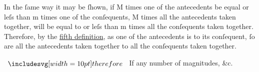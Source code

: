 \documentclass[11pt,preview]{standalone}
\begin{document}
\raggedright In the ſame way it may be ſhown, if M times one of the antecedents be equal or leſs than m times one of the conſequents, M times all the antecedents taken together, will be equal to or leſs than m times all the conſequents taken together. Therefore, by the \hyperref[book5def5]{fifth definition}, as one of the antecedents is to its conſequent, ſo are all the antecedents taken together to all the conſequents taken together.\\

\hfill

$\btherefore$ If any number of magnitudes, \&c.
\end{document}
